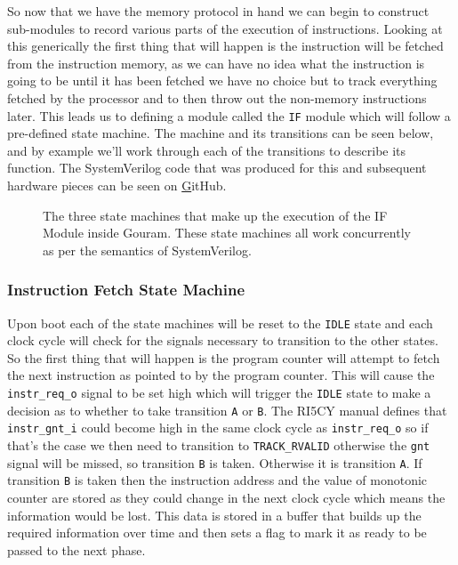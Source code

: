 So now that we have the memory protocol in hand we can begin to construct sub-modules to record various parts of the execution of instructions. Looking at this generically the first thing that will happen is the instruction will be fetched from the instruction memory, as we can have no idea what the instruction is going to be until it has been fetched we have no choice but to track everything fetched by the processor and to then throw out the non-memory instructions later. This leads us to defining a module called the \texttt{IF} module which will follow a pre-defined state machine. The machine and its transitions can be seen below, and by example we'll work through each of the transitions to describe its function. The SystemVerilog code that was produced for this and subsequent hardware pieces can be seen on \href{URL} GitHub.

\begin{figure}[htbp]
	
	\caption{The three state machines that make up the execution of the IF Module inside Gouram. These state machines all work concurrently as per the semantics of SystemVerilog.}
	\label{fig:if-state-machine}
\end{figure}

\subsubsection{Instruction Fetch State Machine}

Upon boot each of the state machines will be reset to the \texttt{IDLE} state and each clock cycle will check for the signals necessary to transition to the other states. So the first thing that will happen is the program counter will attempt to fetch the next instruction as pointed to by the program counter. This will cause the \texttt{instr\_req\_o} signal to be set high which will trigger the \texttt{IDLE} state to make a decision as to whether to take transition \texttt{A} or \texttt{B}. The RI5CY manual defines that \texttt{instr\_gnt\_i} could become high in the same clock cycle as \texttt{instr\_req\_o} so if that's the case we then need to transition to \texttt{TRACK\_RVALID} otherwise the \texttt{gnt} signal will be missed, so transition \texttt{B} is taken. Otherwise it is transition \texttt{A}. If transition \texttt{B} is taken then the instruction address and the value of monotonic counter are stored as they could change in the next clock cycle which means the information would be lost. This data is stored in a buffer that builds up the required information over time and then sets a flag to mark it as ready to be passed to the next phase.

